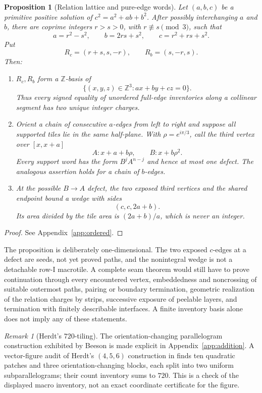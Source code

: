 \documentclass[11pt]{amsart}
\newtheorem{proposition}[theorem]{Proposition}
\theoremstyle{definition}
\theoremstyle{remark}
\newtheorem{remark}[theorem]{Remark}
\newcommand{\Z}{\mathbb Z}
\begin{document}
\begin{proposition}[Relation lattice and pure-edge words]
\label{prop:relationwords}
Let $(a,b,c)$ be a primitive positive solution of
$c^2=a^2+ab+b^2$.  After possibly interchanging $a$ and $b$, there are
coprime integers $r>s>0$, with $r\not\equiv s\pmod3$, such that
\[
 a=r^2-s^2,\qquad b=2rs+s^2,\qquad c=r^2+rs+s^2.
\]
Put
\[
 R_c=(r+s,s,-r),\qquad R_b=(s,-r,s).
\]
Then:
\begin{enumerate}[label=\textup{(\roman*)}]
\item $R_c,R_b$ form a $\Z$-basis of
\[
       \{(x,y,z)\in\Z^3:ax+by+cz=0\}.
\]
Thus every signed equality of unordered full-edge inventories along a
collinear segment has two unique integer charges.
\item Orient a chain of consecutive $a$-edges from left to right and suppose
all supported tiles lie in the same half-plane.  With
$\rho=e^{i\pi/3}$, call the third vertex over $[x,x+a]$
\[
        A:x+a+b\rho,\qquad B:x+b\rho^2.
\]
Every support word has the form $B^jA^{n-j}$ and hence at most one defect.
The analogous assertion holds for a chain of $b$-edges.
\item At the possible $B\to A$ defect, the two exposed third vertices and
the shared endpoint bound a wedge with sides
\[
                     (c,c,2a+b).
\]
Its area divided by the tile area is $(2a+b)/a$, which is never an integer.
\end{enumerate}
\end{proposition}

\begin{proof}
See Appendix~\ref{app:ordered}.
\end{proof}

The proposition is deliberately one-dimensional.  The two exposed
$c$-edges at a defect are seeds, not yet proved paths, and the nonintegral
wedge is not a detachable row-I macrotile.  A complete seam theorem would
still have to prove continuation through every encountered vertex,
embeddedness and noncrossing of suitable outermost paths, pairing or boundary
termination, geometric realization of the relation charges by strips,
successive exposure of peelable layers, and termination with finitely
describable interfaces.  A finite inventory basis alone does not imply any
of these statements.

\begin{remark}[Herdt's $720$-tiling]\label{rem:720macro}
The orientation-changing parallelogram construction exhibited by Beeson
\cite[Fig.~22]{BeesonIso} is made explicit in
Appendix~\ref{app:addition}.  A vector-figure audit of Herdt's
$(4,5,6)$ construction in \cite[Fig.~24]{BeesonIso} finds ten quadratic
patches and three orientation-changing blocks, each split into two uniform
subparallelograms; their count inventory sums to $720$.  This is a
check of the displayed macro inventory, not an exact coordinate certificate
for the figure.
\end{remark}
\end{document}
